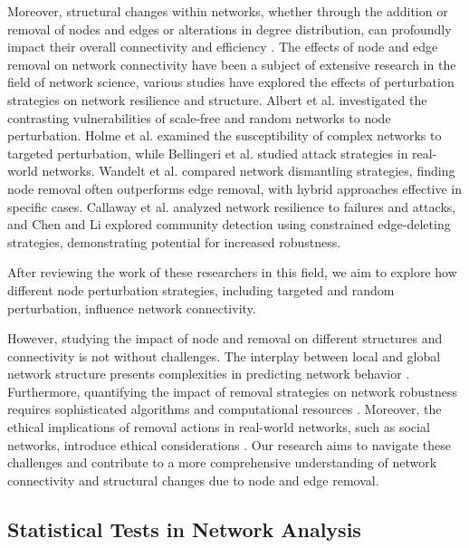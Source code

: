 \documentclass[conference]{IEEEtran} %
\begin{document}
Moreover, structural changes within networks, whether through the addition or removal of nodes and edges or alterations in degree distribution, can profoundly impact their overall connectivity and efficiency \cite{albert2000error, schneider2011mitigation}. The effects of node and edge removal on network connectivity have been a subject of extensive research in the field of network science, various studies have explored the effects of perturbation strategies on network resilience and structure. Albert et al. \cite{albert2000error} investigated the contrasting vulnerabilities of scale-free and random networks to node perturbation. Holme et al. \cite{holme2002attack} examined the susceptibility of complex networks to targeted perturbation, while Bellingeri et al. \cite{Bellingeri_2014} studied attack strategies in real-world networks. Wandelt et al. \cite{wandelt2018comparative} compared network dismantling strategies, finding node removal often outperforms edge removal, with hybrid approaches effective in specific cases. Callaway et al. \cite{callaway2000network} analyzed network resilience to failures and attacks, and Chen and Li \cite{chen2019community} explored community detection using constrained edge-deleting strategies, demonstrating potential for increased robustness. 

After reviewing the work of these researchers in this field, we aim to explore how different node perturbation strategies, including targeted and random perturbation, influence network connectivity.

However, studying the impact of node and removal on different structures and connectivity is not without challenges. The interplay between local and global network structure presents complexities in predicting network behavior \cite{holme2002attack}. Furthermore, quantifying the impact of removal strategies on network robustness requires sophisticated algorithms and computational resources \cite{schneider2011mitigation}. Moreover, the ethical implications of removal actions in real-world networks, such as social networks, introduce ethical considerations \cite{baltar2012unintended}. Our research aims to navigate these challenges and contribute to a more comprehensive understanding of network connectivity and structural changes due to node and edge removal.

\subsection{Statistical Tests in Network Analysis}
\end{document}

